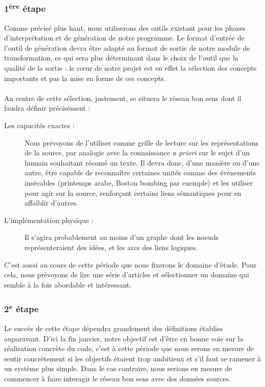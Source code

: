\documentclass{article}           %
\begin{document}
\subsubsection{1\textsuperscript{ère} étape}

Comme précisé plus haut, nous utiliserons des outils existant pour les phases d'interprétation et de génération de notre programme. Le format d'entrée de l'outil de génération devra \^{e}tre adapté au format de sortie de notre module de transformation, ce qui sera plus déterminant dans le choix de l'outil que la qualité de la sortie : le cœur de notre projet est en effet la sélection des concepts importants et pas la mise en forme de ces concepts.

\paragraph{}
Au centre de cette sélection, justement, se situera le réseau bon sens dont il faudra définir précisément :
\begin{description}
	\item[Les capacités exactes :]Nous prévoyons de l'utiliser comme grille de lecture sur les représentations de la source, par analogie avec la connaissance \textit{a priori} sur le sujet d'un humain souhaitant résumé un texte. Il devra donc, d'une manière ou d'une autre, \^{e}tre capable de reconna\^{i}tre certaines unités comme des évènements insécables (printemps arabe, Boston bombing par exemple) et les utiliser pour agir sur la source, renforçant certains liens sémantiques pour en affaiblir d'autres.
	\item[L'implémentation physique :]Il s'agira probablement au moins d'un graphe dont les noeuds représenteraient des idées, et les arcs des liens logiques.
\end{description}

C'est aussi au cours de cette période que nous fixerons le domaine d'étude. Pour cela, nous prévoyons de lire une série d'articles et sélectionner un domaine qui semble à la fois abordable et intéressant.

\subsubsection{2\textsuperscript{e} étape}

Le succès de cette étape dépendra grandement des définitions établies auparavant. D'ici la fin janvier, notre objectif est d'\^{e}tre en bonne voie sur la réalisation concrète du code, c'est à cette période que nous serons en mesure de sentir concrètement si les objectifs étaient trop ambitieux et s'il faut se ramener à un système plus simple. Dans le cas contraire, nous serions en mesure de commencer à faire interagir le réseau bon sens avec des données sources.
\end{document}
